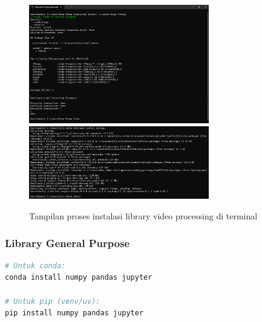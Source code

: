 \documentclass[11pt,a4paper]{article}
\begin{document}
\begin{figure}[H]
    \centering
    \includegraphics[width=0.7\textwidth]{Figure/ss/7.png}
    \includegraphics[width=0.7\textwidth]{Figure/ss/8.png}
    \caption{Tampilan proses instalasi library video processing di terminal}
    \label{fig:video_library}
\end{figure}

\subsubsection{Library General Purpose}
\begin{lstlisting}[language=bash, caption=Instalasi library umum]
# Untuk conda:
conda install numpy pandas jupyter

# Untuk pip (venv/uv):
pip install numpy pandas jupyter
\end{lstlisting}
\end{document}
